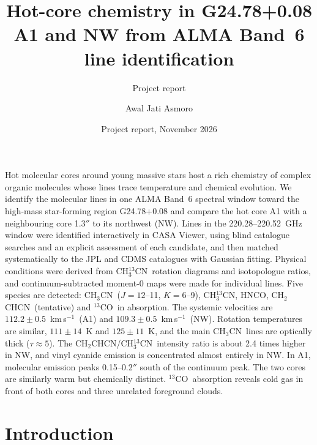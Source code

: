 \documentclass{aa}
\newcommand{\kms}{km\,s$^{-1}$}
\newcommand{\chcn}{CH$_3$CN}
\newcommand{\chtcn}{CH$_3^{13}$CN}
\newcommand{\vycn}{CH$_2$CHCN}
\newcommand{\tco}{$^{13}$CO}
\begin{document}
\title{Hot-core chemistry in G24.78+0.08 A1 and NW from ALMA Band~6 line identification}
\subtitle{Project report}

\author{Awal Jati Asmoro}


\date{Project report, November 2026}

\abstract
{Hot molecular cores around young massive stars host a rich chemistry of complex organic molecules whose lines trace temperature and chemical evolution.}
{We identify the molecular lines in one ALMA Band~6 spectral window toward the high-mass star-forming region G24.78+0.08 and compare the hot core A1 with a neighbouring core 1.3$''$ to its northwest (NW).}
{Lines in the 220.28--220.52~GHz window were identified interactively in CASA Viewer, using blind catalogue searches and an explicit assessment of each candidate, and then matched systematically to the JPL and CDMS catalogues with Gaussian fitting. Physical conditions were derived from \chtcn\ rotation diagrams and isotopologue ratios, and continuum-subtracted moment-0 maps were made for individual lines.}
{Five species are detected: \chcn\ ($J=12$--11, $K=6$--9), \chtcn, HNCO, \vycn\ (tentative) and \tco\ in absorption. The systemic velocities are $112.2\pm0.5$~\kms\ (A1) and $109.3\pm0.5$~\kms\ (NW). Rotation temperatures are similar, $111\pm14$~K and $125\pm11$~K, and the main \chcn\ lines are optically thick ($\tau\approx5$). The \vycn/\chtcn\ intensity ratio is about 2.4 times higher in NW, and vinyl cyanide emission is concentrated almost entirely in NW. In A1, molecular emission peaks 0.15--0.2$''$ south of the continuum peak.}
{The two cores are similarly warm but chemically distinct. \tco\ absorption reveals cold gas in front of both cores and three unrelated foreground clouds.}


\maketitle

\section{Introduction}
\end{document}
